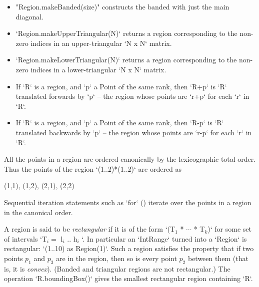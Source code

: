 \begin{itemize}
\item \xcd"Region.makeBanded(size)" constructs the banded  with
      just the main diagonal.
\item \xcd`Region.makeUpperTriangular(N)` returns a region corresponding
to the non-zero indices in an upper-triangular \xcd`N x N` matrix.
\item \xcd`Region.makeLowerTriangular(N)` returns a region corresponding
to the non-zero indices in a lower-triangular \xcd`N x N` matrix.
\item 
  If \xcd`R` is a region, and \xcd`p` a Point of the same rank, then 
  \xcd`R+p` is \xcd`R` translated forwards by 
  \xcd`p` -- the region whose
  points are \xcd`r+p` 
  for each \xcd`r` in \xcd`R`.
\item 
  If \xcd`R` is a region, and \xcd`p` a Point of the same rank, then 
  \xcd`R-p` is \xcd`R` translated backwards by 
  \xcd`p` -- the region whose
  points are \xcd`r-p` 
  for each \xcd`r` in \xcd`R`.

\end{itemize}

All the points in a region are ordered canonically by the
lexicographic total order. Thus the points of the region \xcd`(1..2)*(1..2)`
are ordered as 
\begin{xten}
(1,1), (1,2), (2,1), (2,2)
\end{xten}
Sequential iteration statements such as \xcd`for` ()
iterate over the points in a region in the canonical order.

A region is said to be {\em rectangular} if it is of
the form \xcdmath`(T$_1$ * $\cdots$ * T$_k$)` for some set of intervals
\xcdmath`T$_i = $ l$_i$ .. h$_i$ `. 
In particular an \xcd`IntRange` turned into a \xcd`Region` is rectangular: 
\xcd`(1..10) as Region(1)`.
Such a
region satisfies the property that if two points $p_1$ and $p_3$ are
in the region, then so is every point $p_2$ between them (that is, it is {\em convex}). 
(Banded and triangular regions are not rectangular.)
The operation
\xcd`R.boundingBox()` gives the smallest rectangular region containing
\xcd`R`.

